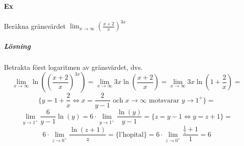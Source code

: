 \paragraph{Ex} Beräkna gränsvärdet $\lim_{x\to\infty}(\frac{x+2}{x})^{3x}$
\subparagraph{Lösning}
Betrakta först logaritmen av gränsvärdet, dvs.
\begin{equation*}
    \lim_{x\to\infty}\ln((\frac{x+2}{x})^{3x})=
    \lim_{x\to\infty}3x\ln(\frac{x+2}{x})=
    \lim_{x\to\infty}3x\ln(1+\frac{2}{x})=
\end{equation*}
\begin{equation*}
    \{y=1+\frac{2}{x}\Leftrightarrow x=\frac{2}{y-1}\text{ och }x\to\infty\text{ motsvarar }y\to 1^+\}=
\end{equation*}
\begin{equation*}
    \lim_{y\to 1^+}\frac{6}{y-1}\ln(y)=
    6\cdot\lim_{y\to 1^+}\frac{\ln(y)}{y-1}=
    \{z=y-1\Leftrightarrow y=z+1\}=
\end{equation*}
\begin{equation*}
    6\cdot\lim_{z\to 0^+}\frac{\ln(z+1)}{z}=
    \{\text{l'hopital}\}=
    6\cdot \lim_{z\to 0^+}\frac{\frac{1}{z}+1}{1}=6
\end{equation*}